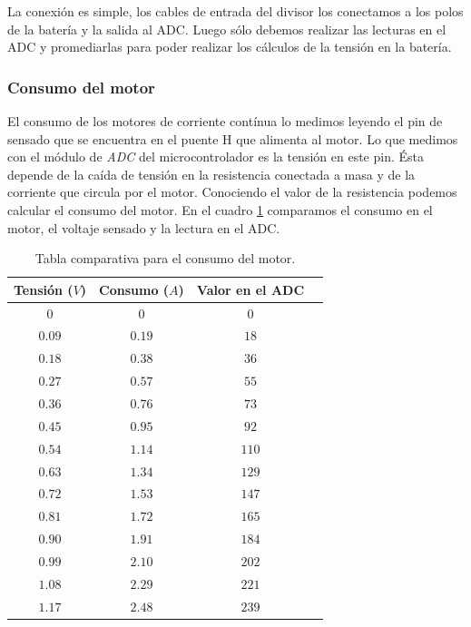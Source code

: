 La conexi\'on es simple, los cables de entrada del divisor los conectamos a los polos de la bater\'ia y la salida al ADC.
Luego s\'olo debemos realizar las lecturas en el ADC y promediarlas para poder realizar los c\'alculos de la tensi\'on en la bater\'ia.

\subsubsection{Consumo del motor}
\label{h_sensado_consumo}

El consumo de los motores de corriente cont\'inua lo medimos leyendo el pin de sensado que se encuentra en el puente H que alimenta al motor.
Lo que medimos con el m\'odulo de \emph{ADC} del microcontrolador es la tensi\'on en este pin.
\'Esta depende de la ca\'ida de tensi\'on en la resistencia conectada a masa y de la corriente que circula por el motor.
Conociendo el valor de la resistencia podemos calcular el consumo del motor.
En el cuadro \ref{hT_consumo} comparamos el consumo en el motor, el voltaje sensado y la lectura en el ADC.

\begin{table}[h]
	\begin{center}
		\begin{tabular}{|c|c|c|c|}
			\hline
			Tensi\'on ($V$) & Consumo ($A$) & Valor en el ADC \\
			\hline
			$0$ & $0$ & $0$ \\
			$0.09$ & $0.19$ & $18$ \\
			$0.18$ & $0.38$ & $36$ \\
			$0.27$ & $0.57$ & $55$ \\
			$0.36$ & $0.76$ & $73$ \\
			$0.45$ & $0.95$ & $92$ \\
			$0.54$ & $1.14$ & $110$ \\
			$0.63$ & $1.34$ & $129$ \\
			$0.72$ & $1.53$ & $147$ \\
			$0.81$ & $1.72$ & $165$ \\
			$0.90$ & $1.91$ & $184$ \\
			$0.99$ & $2.10$ & $202$ \\
			$1.08$ & $2.29$ & $221$ \\
			$1.17$ & $2.48$ & $239$ \\
			\hline
		\end{tabular}
	\end{center}
	\caption{Tabla comparativa para el consumo del motor.}
	\label{hT_consumo}
\end{table}

